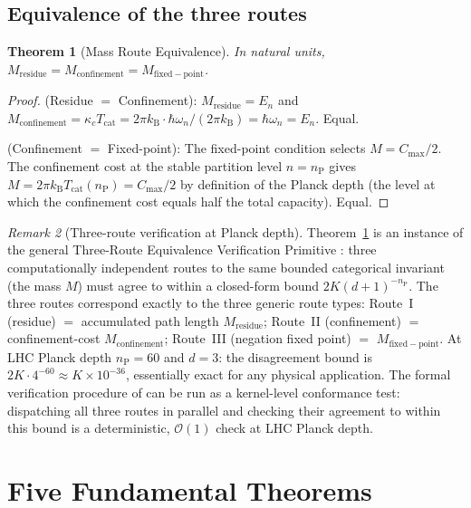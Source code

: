\documentclass[twocolumn,10pt,a4paper]{article}
\theoremstyle{thmstyle}
\newtheorem{theorem}{Theorem}[section]
\theoremstyle{definition}
\theoremstyle{remark}
\newtheorem{remark}[theorem]{Remark}
\newcommand{\kB}{k_{\mathrm{B}}}
\newcommand{\nP}{n_{\mathrm{P}}}
\newcommand{\Tcat}{T_{\mathrm{cat}}}
\begin{document}
\subsection{Equivalence of the three routes}

\begin{theorem}[Mass Route Equivalence]
\label{thm:mass_equiv}
In natural units, $M_{\mathrm{residue}} = M_{\mathrm{confinement}}
= M_{\mathrm{fixed-point}}$.
\end{theorem}

\begin{proof}
(Residue $=$ Confinement): $M_{\mathrm{residue}} = E_n$ and
$M_{\mathrm{confinement}} = \kappa_c\Tcat = 2\pi\kB\cdot\hbar\omega_n/(2\pi\kB)
= \hbar\omega_n = E_n$. Equal.

(Confinement $=$ Fixed-point): The fixed-point condition selects
$M = C_{\max}/2$. The confinement cost at the stable partition level
$n = \nP$ gives $M = 2\pi\kB\Tcat(\nP) = C_{\max}/2$ by definition
of the Planck depth (the level at which the confinement cost equals
half the total capacity). Equal.
\end{proof}

\begin{remark}[Three-route verification at Planck depth]
Theorem~\ref{thm:mass_equiv} is an instance of the general Three-Route
Equivalence Verification Primitive \citep{companion:verification}: three
computationally independent routes to the same bounded categorical invariant
(the mass $M$) must agree to within a closed-form bound
$2K(d+1)^{-\nP}$.
The three routes correspond exactly to the three generic route types:
Route~I (residue) $=$ accumulated path length $M_{\mathrm{residue}}$;
Route~II (confinement) $=$ confinement-cost $M_{\mathrm{confinement}}$;
Route~III (negation fixed point) $=$ $M_{\mathrm{fixed-point}}$.
At LHC Planck depth $\nP = 60$ and $d = 3$: the disagreement bound is
$2K \cdot 4^{-60} \approx K\times 10^{-36}$, essentially exact for any
physical application.
The formal verification procedure of \citet{companion:verification} can
be run as a kernel-level conformance test: dispatching all three routes
in parallel and checking their agreement to within this bound is a
deterministic, $\mathcal{O}(1)$ check at LHC Planck depth.
\end{remark}

\section{Five Fundamental Theorems}
\label{sec:five_theorems}
\end{document}
